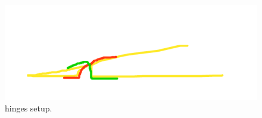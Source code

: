 \begin{figure}[H]
\centering
  \includegraphics[width=\linewidth]{figs/hinges.png}
  \caption{hinges setup.}
  \label{fig:hinges}
\end{figure}
	


